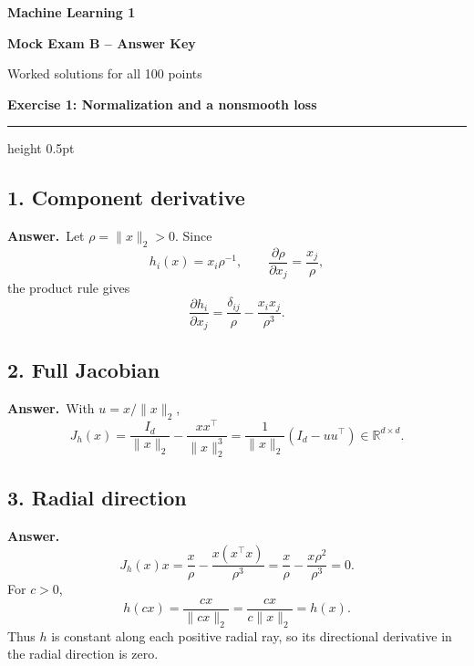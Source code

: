 \documentclass[11pt,a4paper]{article}
\newcommand{\exercise}[2]{%
  \Needspace{8\baselineskip}%
  \par\addvspace{1.1em}%
  {\Large\bfseries\color{examblue}Exercise #1: #2\par}%
  \nobreak\vspace{0.2em}%
  {\color{rulegray}\hrule height 0.5pt}%
  \vspace{0.55em}%
}
\newcommand{\answer}{\textbf{Answer.}\ }
\begin{document}
\begin{center}
  {\Huge\bfseries\color{examblue} Machine Learning 1}\par
  \vspace{0.35em}
  {\LARGE\bfseries Mock Exam B -- Answer Key}\par
  \vspace{0.7em}
  {\large Worked solutions for all 100 points}
\end{center}

\vspace{0.8em}

\exercise{1}{Normalization and a nonsmooth loss}

\subsection*{1. Component derivative}

\answer Let $\rho=\lVert x\rVert_2>0$. Since
\[
  h_i(x)=x_i\rho^{-1},
  \qquad
  \frac{\partial\rho}{\partial x_j}=\frac{x_j}{\rho},
\]
the product rule gives
\[
  \boxed{\frac{\partial h_i}{\partial x_j}
  =\frac{\delta_{ij}}{\rho}-\frac{x_ix_j}{\rho^3}}.
\]

\subsection*{2. Full Jacobian}

\answer With $u=x/\lVert x\rVert_2$,
\[
  \boxed{J_h(x)=\frac{I_d}{\lVert x\rVert_2}
  -\frac{xx^\top}{\lVert x\rVert_2^3}
  =\frac{1}{\lVert x\rVert_2}(I_d-uu^\top)}
  \in\mathbb{R}^{d\times d}.
\]

\subsection*{3. Radial direction}

\answer
\[
  J_h(x)x
  =\frac{x}{\rho}-\frac{x(x^\top x)}{\rho^3}
  =\frac{x}{\rho}-\frac{x\rho^2}{\rho^3}=0.
\]
For $c>0$,
\[
  h(cx)=\frac{cx}{\lVert cx\rVert_2}
  =\frac{cx}{c\lVert x\rVert_2}=h(x).
\]
Thus $h$ is constant along each positive radial ray, so its directional derivative in the radial direction is zero.
\end{document}
